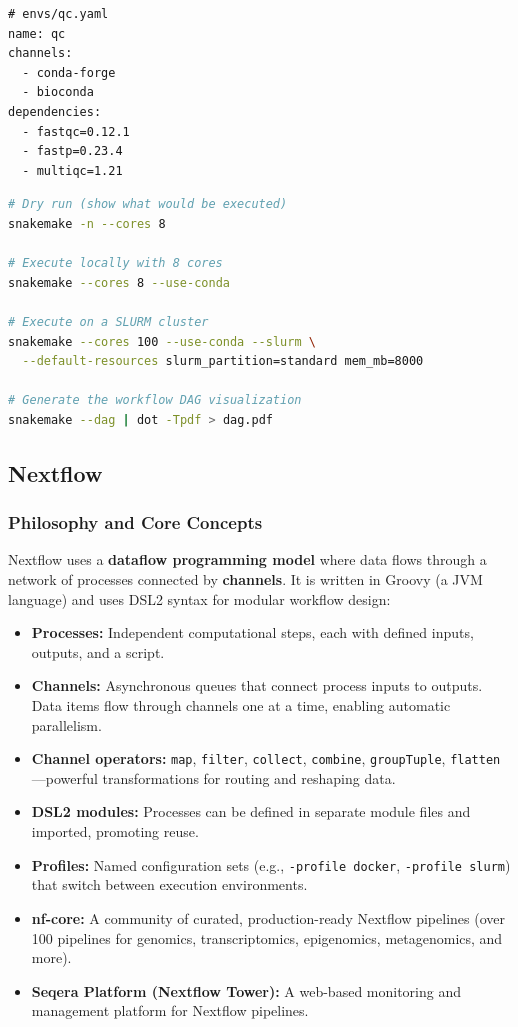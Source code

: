 \begin{lstlisting}[caption={Conda environment file for QC tools (envs/qc.yaml).},label=lst:conda-qc]
# envs/qc.yaml
name: qc
channels:
  - conda-forge
  - bioconda
dependencies:
  - fastqc=0.12.1
  - fastp=0.23.4
  - multiqc=1.21
\end{lstlisting}

\begin{lstlisting}[language=bash,caption={Running the Snakemake QC pipeline.},label=lst:snakemake-run]
# Dry run (show what would be executed)
snakemake -n --cores 8

# Execute locally with 8 cores
snakemake --cores 8 --use-conda

# Execute on a SLURM cluster
snakemake --cores 100 --use-conda --slurm \
  --default-resources slurm_partition=standard mem_mb=8000

# Generate the workflow DAG visualization
snakemake --dag | dot -Tpdf > dag.pdf
\end{lstlisting}

\subsection{Nextflow}
\label{subsec:bioinf:nextflow}

\subsubsection{Philosophy and Core Concepts}

Nextflow uses a \textbf{dataflow programming model} where data flows through a network of processes connected by \textbf{channels}. It is written in Groovy (a JVM language) and uses DSL2 syntax for modular workflow design:

\begin{itemize}[itemsep=2pt]
  \item \textbf{Processes:} Independent computational steps, each with defined inputs, outputs, and a script.
  \item \textbf{Channels:} Asynchronous queues that connect process inputs to outputs. Data items flow through channels one at a time, enabling automatic parallelism.
  \item \textbf{Channel operators:} \texttt{map}, \texttt{filter}, \texttt{collect}, \texttt{combine}, \texttt{groupTuple}, \texttt{flatten}---powerful transformations for routing and reshaping data.
  \item \textbf{DSL2 modules:} Processes can be defined in separate module files and imported, promoting reuse.
  \item \textbf{Profiles:} Named configuration sets (e.g., \texttt{-profile docker}, \texttt{-profile slurm}) that switch between execution environments.
  \item \textbf{nf-core:} A community of curated, production-ready Nextflow pipelines (over 100 pipelines for genomics, transcriptomics, epigenomics, metagenomics, and more).
  \item \textbf{Seqera Platform (Nextflow Tower):} A web-based monitoring and management platform for Nextflow pipelines.
\end{itemize}

